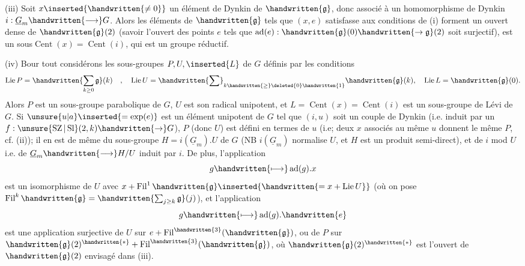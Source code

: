 (iii) Soit $x\inserted{\handwritten{\ne0}}$ un élément de Dynkin de $\handwritten{\mathfrak{g}}$, donc associé à un homomorphisme de Dynkin $i:\underline{G}_m\handwritten{\longrightarrow}G$. Alors les éléments de $\handwritten{\mathfrak{g}}$ tels que $(x,e)$ satisfasse aux conditions de (i) forment un ouvert dense de $\handwritten{\mathfrak{g}}(2)$ (savoir l'ouvert des points $e$ tels que $\operatorname{ad}(e):\handwritten{\mathfrak{g}}(0)\handwritten{\to\mathfrak{g}}(2)$ soit surjectif),  est un  sous$\operatorname{Cent}(x)=\operatorname{Cent}(i)$, qui est un groupe réductif.

(iv) Bour tout  considérons les sous-groupes $P,U,\inserted{L}$ de $G$ définis par les conditions
\[
\operatorname{Lie}P=\handwritten{\sum_{k\geq0}\mathfrak{g}}(k)\quad,\quad
\operatorname{Lie}U=\handwritten{\sum}_{k\handwritten{\geq}\deleted{0}\handwritten{1}}\handwritten{\mathfrak{g}}(k),\quad
\operatorname{Lie}L=\handwritten{\mathfrak{g}}(0).
\]
Alors $P$ est un sous-groupe parabolique de $G$, $U$ est son radical unipotent, et $L=\operatorname{Cent}(x)=\operatorname{Cent}(i)$  est un sous-groupe de Lévi de $G$. Si $\unsure{u|a}\inserted{=\exp(e)}$ est un élément unipotent de $G$ tel que $(i,u)$ soit un couple de Dynkin (i.e. induit par un $f:\unsure{\operatorname{SZ}|\operatorname{Sl}}(2,k)\handwritten{\to}G$), $P$ (donc  $U$) est défini en termes de $u$ (i.e; deux $x$ associés au même $u$ donnent le même $P$, cf. (ii)); il en est de même du sous-groupe $H=i(\underline{G}_m).U$ de $G$ (NB $i(\underline{G}_m)$ normalise $U$, et $H$ est un produit semi-direct), et de $i$ mod $U$ i.e. de $\underline{G}_m\handwritten{\longrightarrow}H/U$ induit par $i$. De plus, l'application
\[
g\handwritten{\longmapsto}\operatorname{ad}(g).x
\]
est un isomorphisme de $U$ avec $x+\operatorname{Fil}^{1}\handwritten{\mathfrak{g}}\inserted{\handwritten{=x+\operatorname{Lie}U}}$ (où on pose $\operatorname{Fil}^{k}\handwritten{\mathfrak{g}}=\handwritten{\sum_{j\geq k}\mathfrak{g}}(j)$), et l'application
\[
g\handwritten{\longmapsto}\operatorname{ad}(g).\handwritten{e}
\]
est une application surjective de $U$ sur $e+\operatorname{Fil}^{\handwritten{3}}(\handwritten{\mathfrak{g}})$, ou de $P$ sur $\handwritten{\mathfrak{g}}(2)^{\handwritten{*}}+\operatorname{Fil}^{\handwritten{3}}(\handwritten{\mathfrak{g}})$, où $\handwritten{\mathfrak{g}}(2)^{\handwritten{*}}$ est l'ouvert de $\handwritten{\mathfrak{g}}(2)$ envisagé dans (iii).

